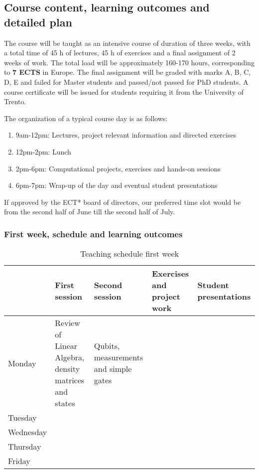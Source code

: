 \documentclass[superscriptaddress,amsmath,amssymb,aps,floatfix]{revtex4-2}
\begin{document}
\subsection{Course content, learning outcomes and detailed plan}

The course will be taught as an intensive course of duration of three
weeks, with a total time of 45 h of lectures, 45 h of exercises and a
final assignment of 2 weeks of work. The total load will be
approximately 160-170 hours, corresponding to \textbf{7 ECTS} in
Europe.  The final assignment will be graded with marks A, B, C, D, E
and failed for Master students and passed/not passed for PhD
students. A course certificate will be issued for students requiring
it from the University of Trento.

The organization of a typical course day is as follows:

\begin{enumerate}
\def\labelenumi{\arabic{enumi}.}
\item
  9am-12pm: Lectures, project relevant information and directed
  exercises
\item
  12pm-2pm: Lunch
\item
  2pm-6pm: Computational projects, exercises and hands-on sessions
\item
  6pm-7pm: Wrap-up of the day and eventual student presentations
\end{enumerate}

If approved by the ECT* board of directors, our preferred time slot
would be from the second half of June till the second half of July.


\subsubsection{First week, schedule and learning outcomes}

\begin{table}[hbtp]
\begin{tabular}{|l|l|l|l|l|} \hline
    & First session  & Second session  & Exercises and project work & Student presentations \\ \hline
  Monday & Review of Linear Algebra, density matrices and states & Qubits, measurements and simple gates & & \\
  Tuesday & & & & \\
  Wednesday & & & & \\
  Thursday & & & & \\
  Friday & & & & \\ \hline
\end{tabular}
\caption{Teaching schedule first week}
\end{table}
\end{document}
